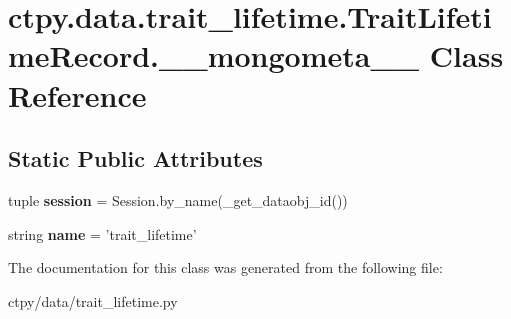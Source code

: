 \hypertarget{classctpy_1_1data_1_1trait__lifetime_1_1_trait_lifetime_record_1_1____mongometa____}{\section{ctpy.\-data.\-trait\-\_\-lifetime.\-Trait\-Lifetime\-Record.\-\_\-\-\_\-mongometa\-\_\-\-\_\- Class Reference}
\label{classctpy_1_1data_1_1trait__lifetime_1_1_trait_lifetime_record_1_1____mongometa____}
}
\subsection*{Static Public Attributes}
\begin{DoxyCompactItemize}
\item 
\hypertarget{classctpy_1_1data_1_1trait__lifetime_1_1_trait_lifetime_record_1_1____mongometa_____a05ad375bd3ef3c1b2562731b3f4dfacf}{tuple {\bfseries session} = Session.\-by\-\_\-name(\-\_\-get\-\_\-dataobj\-\_\-id())}\label{classctpy_1_1data_1_1trait__lifetime_1_1_trait_lifetime_record_1_1____mongometa_____a05ad375bd3ef3c1b2562731b3f4dfacf}

\item 
\hypertarget{classctpy_1_1data_1_1trait__lifetime_1_1_trait_lifetime_record_1_1____mongometa_____af2730a50319b4997f99b5906f03dc770}{string {\bfseries name} = 'trait\-\_\-lifetime'}\label{classctpy_1_1data_1_1trait__lifetime_1_1_trait_lifetime_record_1_1____mongometa_____af2730a50319b4997f99b5906f03dc770}

\end{DoxyCompactItemize}


The documentation for this class was generated from the following file\-:\begin{DoxyCompactItemize}
\item 
ctpy/data/trait\-\_\-lifetime.\-py\end{DoxyCompactItemize}
